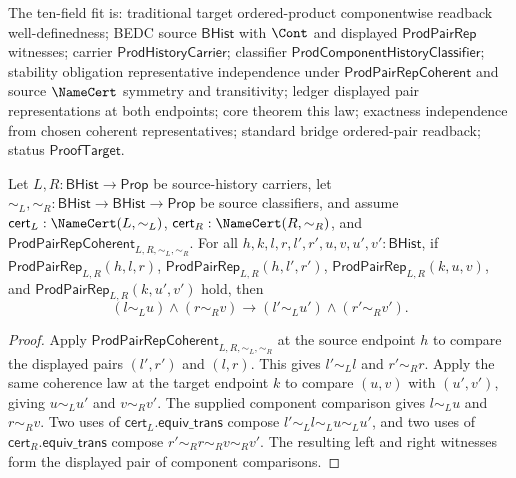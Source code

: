 \begin{theorem}
\label{thm:prod-component-history-classifier-representative-independence}
The ten-field fit is: traditional target ordered-product componentwise readback
well-definedness; BEDC source $\mathsf{BHist}$ with $\Cont$ and displayed
$\mathsf{ProdPairRep}$ witnesses; carrier $\mathsf{ProdHistoryCarrier}$;
classifier $\mathsf{ProdComponentHistoryClassifier}$; stability obligation
representative independence under $\mathsf{ProdPairRepCoherent}$ and source
$\NameCert$ symmetry and transitivity; ledger displayed pair representations at
both endpoints; core theorem this law; exactness independence from chosen
coherent representatives; standard bridge ordered-pair readback; status
$\mathsf{ProofTarget}$.

Let $L,R:\mathsf{BHist}\to\mathsf{Prop}$ be source-history carriers, let
$\sim_L,\sim_R:\mathsf{BHist}\to\mathsf{BHist}\to\mathsf{Prop}$ be source
classifiers, and assume $\mathsf{cert}_L:\NameCert(L,\sim_L)$,
$\mathsf{cert}_R:\NameCert(R,\sim_R)$, and
$\mathsf{ProdPairRepCoherent}_{L,R,\sim_L,\sim_R}$. For all
$h,k,l,r,l',r',u,v,u',v':\mathsf{BHist}$, if
$\mathsf{ProdPairRep}_{L,R}(h,l,r)$,
$\mathsf{ProdPairRep}_{L,R}(h,l',r')$,
$\mathsf{ProdPairRep}_{L,R}(k,u,v)$, and
$\mathsf{ProdPairRep}_{L,R}(k,u',v')$ hold, then
$$
(l\sim_L u)\wedge(r\sim_R v)\to
(l'\sim_L u')\wedge(r'\sim_R v').
$$
\end{theorem}
\begin{proof}
Apply $\mathsf{ProdPairRepCoherent}_{L,R,\sim_L,\sim_R}$ at the source endpoint
$h$ to compare the displayed pairs $(l',r')$ and $(l,r)$. This gives
$l'\sim_L l$ and $r'\sim_R r$. Apply the same coherence law at the target
endpoint $k$ to compare $(u,v)$ with $(u',v')$, giving $u\sim_L u'$ and
$v\sim_R v'$. The supplied component comparison gives $l\sim_L u$ and
$r\sim_R v$. Two uses of $\mathsf{cert}_L.\mathsf{equiv\_trans}$ compose
$l'\sim_L l\sim_L u\sim_L u'$, and two uses of
$\mathsf{cert}_R.\mathsf{equiv\_trans}$ compose
$r'\sim_R r\sim_R v\sim_R v'$. The resulting left and right witnesses form the
displayed pair of component comparisons.
\end{proof}

